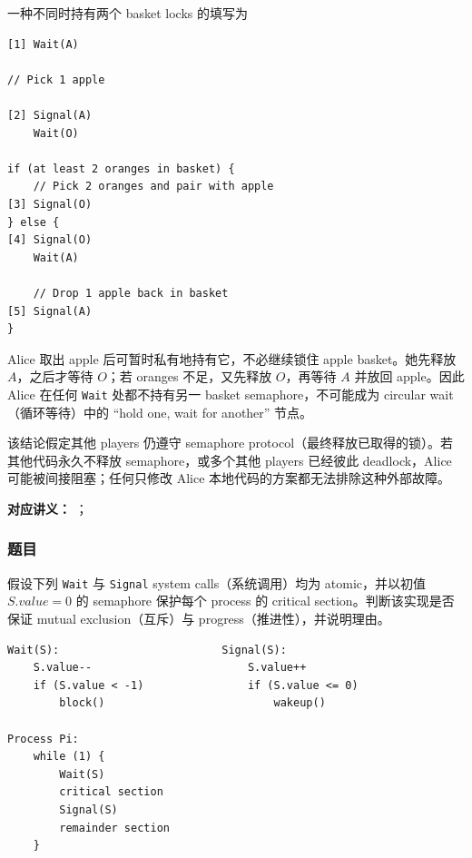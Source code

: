 \begin{checkedsolution}
一种不同时持有两个 basket locks 的填写为
\begin{verbatim}
[1] Wait(A)

// Pick 1 apple

[2] Signal(A)
    Wait(O)

if (at least 2 oranges in basket) {
    // Pick 2 oranges and pair with apple
[3] Signal(O)
} else {
[4] Signal(O)
    Wait(A)

    // Drop 1 apple back in basket
[5] Signal(A)
}
\end{verbatim}

Alice 取出 apple 后可暂时私有地持有它，不必继续锁住 apple basket。她先释放 $A$，之后才等待 $O$；若 oranges 不足，又先释放 $O$，再等待 $A$ 并放回 apple。因此 Alice 在任何 \texttt{Wait} 处都不持有另一 basket semaphore，不可能成为 circular wait（循环等待）中的 ``hold one, wait for another'' 节点。

该结论假定其他 players 仍遵守 semaphore protocol（最终释放已取得的锁）。若其他代码永久不释放 semaphore，或多个其他 players 已经彼此 deadlock，Alice 可能被间接阻塞；任何只修改 Alice 本地代码的方案都无法排除这种外部故障。
\end{checkedsolution}


\textbf{对应讲义：}
；

\subsubsection*{题目}

假设下列 \texttt{Wait} 与 \texttt{Signal} system calls（系统调用）均为 atomic，并以初值 $S.value=0$ 的 semaphore 保护每个 process 的 critical section。判断该实现是否保证 mutual exclusion（互斥）与 progress（推进性），并说明理由。

\begin{verbatim}
Wait(S):                         Signal(S):
    S.value--                        S.value++
    if (S.value < -1)                if (S.value <= 0)
        block()                          wakeup()

Process Pi:
    while (1) {
        Wait(S)
        critical section
        Signal(S)
        remainder section
    }
\end{verbatim}


